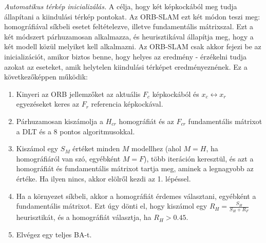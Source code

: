 \textit{Automatikus térkép inicializálás.} A célja, hogy két képkockából meg tudja állapítani a kiindulási térkép pontokat.
Az ORB-SLAM ezt két módon teszi meg: homográfiával síkbeli esetet feltételezve, illetve fundamentális mátrixszal.
Ezt a két módszert párhuzamosan alkalmazza, és heurisztikával állapítja meg, hogy a két modell közül melyiket kell alkalmazni.
Az ORB-SLAM csak akkor fejezi be az inicializációt, amikor biztos benne, hogy helyes az eredmény - érzékelni tudja azokat az eseteket, amik helytelen kiindulási térképet eredményeznének.
Ez a következőképpen működik:
\begin{enumerate}
	\item Kinyeri az ORB jellemzőket az aktuális $F_c$ képkockából és $x_c \leftrightarrow x_r$ egyezéseket keres az $F_r$ referencia képkockával.
	\item Párhuzamosan kiszámolja a $H_{cr}$ homográfiát és az $F_{cr}$ fundamentális mátrixot a DLT és a 8 pontos algoritmusokkal.
	\item Kiszámol egy $S_M$ értéket minden $M$ modellhez (ahol $M = H$, ha homográfiáról van szó, egyébként $M = F$), több iteráción keresztül, és azt a homográfiát és fundamentális mátrixot tartja meg, aminek a legnagyobb az értéke. Ha ilyen nincs, akkor elölről kezdi az 1. lépéssel.
	\item Ha a környezet síkbeli, akkor a homográfiát érdemes választani, egyébként a fundamentális mátrixot. Ezt úgy dönti el, hogy kiszámol egy $R_H = \frac{S_H}{S_H + R_F}$ heurisztikát, és a homográfiát választja, ha $R_H > 0.45$.
	\item Elvégez egy teljes BA-t.
\end{enumerate}

